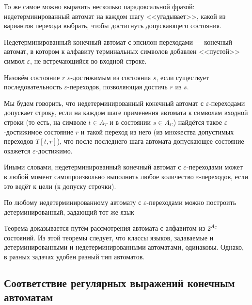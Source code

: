 \documentclass[12pt,a4paper,oneside]{article}
\begin{document}
То же самое можно выразить несколько парадоксальной фразой: недетерминированный автомат 
на каждом шагу <<угадывает>>, какой из вариантов перехода выбрать, чтобы достигнуть 
допускающего состояния. 

\begin{definition}
Недетерминированный конечный автомат с эпсилон-переходами --- 
конечный автомат, в котором к алфавиту терминальных символов добавлен <<пустой>> символ
$\varepsilon$, не встречающийся во входной строке.
\end{definition}

\begin{definition}
Назовём состояние $r$ $\varepsilon$-достижимым из состояния $s$, если существует последовательность
$\varepsilon$-переходов, позволяющая достичь $r$ из $s$.
\end{definition}

\begin{definition}
Мы будем говорить, что недетерминированный конечный автомат с $\varepsilon$-переходами 
допускает строку, если на каждом шаге применения автомата к символам входной строки 
(то есть, на символе $t \in A_T$ и в состоянии $s \in A_C$) найдётся такое 
$\varepsilon$-достижимое состояние $r$ и такой переход из него (из множества допустимых 
переходов $T[t,r]$), что после последнего шага автомата допускающее состояние окажется
$\varepsilon$-достижимо.
\end{definition}

Иными словами, недетерминированный конечный автомат с $\varepsilon$-переходами может в
любой момент самопроизвольно выполнить любое количество $\varepsilon$-переходов,
если это ведёт к цели (к допуску строчки).

\begin{theorem}
По любому недетерминированному автомату с $\varepsilon$-переходами 
можно построить детерминированный, задающий тот же язык
\end{theorem}

Теорема доказывается путём рассмотрения автомата с алфавитом из $2^{A_C}$ состояний. 
Из этой теоремы следует, что классы языков, задаваемые и детерминированными и
недетерминированными автоматами, одинаковы. Однако, в разных задачах удобен разный тип
автоматов.

\subsection{Соответствие регулярных выражений конечным автоматам}
\end{document}
